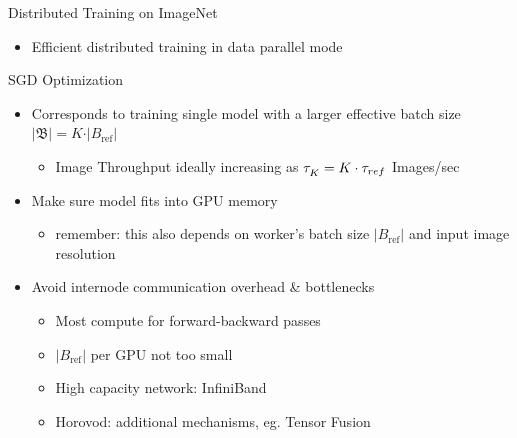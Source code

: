 \begin{frame}{Distributed Training on ImageNet}
\protect\hypertarget{distributed-training-on-imagenet-8}{}
\begin{itemize}
\tightlist
\item
  Efficient distributed training in data parallel mode
\end{itemize}

\begin{block}{SGD Optimization}
\protect\hypertarget{sgd-optimization}{}
\begin{itemize}
\tightlist
\item
  Corresponds to training single model with a larger effective batch
  size \(\vert \mathfrak{B} \vert = K \cdot \vert B_{\text{ref}} \vert\)

  \begin{itemize}
  \tightlist
  \item
    Image Throughput ideally increasing as
    \(\tau_K^{\*} = K \cdot \tau_{ref}\) Images/sec
  \end{itemize}
\item
  Make sure model fits into GPU memory

  \begin{itemize}
  \tightlist
  \item
    remember: this also depends on worker's batch size
    \(\vert B_{\text{ref}} \vert\) and input image resolution
  \end{itemize}
\item
  Avoid internode communication overhead \& bottlenecks

  \begin{itemize}
  \tightlist
  \item
    Most compute for forward-backward passes
  \item
    \(\vert B_{\text{ref}} \vert\) per GPU not too small
  \item
    High capacity network: InfiniBand
  \item
    Horovod: additional mechanisms, eg. Tensor Fusion
  \end{itemize}
\end{itemize}
\end{block}
\end{frame}

